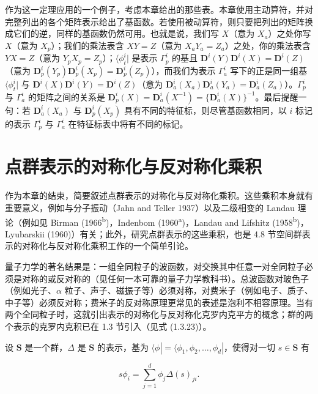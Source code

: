 作为这一定理应用的一个例子，考虑本章给出的那些表。本章使用主动算符，并对完整列出的各个矩阵表示给出了基函数。若使用被动算符，则只要把列出的矩阵换成它们的逆，同样的基函数仍然可用。也就是说，我们写 $X$（意为 $X_{a}$）之处你写 $X$（意为 $X_{p}$）；我们的乘法表含 $XY = Z$（意为 $X_{a}Y_{a} = Z_{a}$）之处，你的乘法表含 $YX = Z$（意为 $Y_{p}X_{p} = Z_{p}$）；$\langle \phi_{t}^{i}|$ 是表示 $\Gamma_{p}^{i}$ 的基且 $\mathbf{D}^{i}(Y)\mathbf{D}^{i}(X) = \mathbf{D}^{i}(Z)$（意为 $\mathbf{D}_{p}^{i}(Y_{p})\mathbf{D}_{p}^{i}(X_{p}) = \mathbf{D}_{p}^{i}(Z_{p})$），而我们为表示 $\Gamma_{a}^{i}$ 写下的正是同一组基 $\langle \phi_{t}^{i}|$ 与 $\mathbf{D}^{i}(X)\mathbf{D}^{i}(Y) = \mathbf{D}^{i}(Z)$（意为 $\mathbf{D}_{a}^{i}(X_{a})\mathbf{D}_{a}^{i}(Y_{a}) = \mathbf{D}_{a}^{i}(Z_{a})$）。$\Gamma_{p}^{i}$ 与 $\Gamma_{a}^{i}$ 的矩阵之间的关系是 $\mathbf{D}_{p}^{i}(X) = \mathbf{D}_{a}^{i}(X^{-1}) = \{\mathbf{D}_{a}^{i}(X)\}^{-1}$。最后提醒一句：若 $\mathbf{D}_{a}^{i}(X_{a})$ 与 $\mathbf{D}_{p}^{i}(X_{p})$ 具有不同的特征标，则尽管基函数相同，以 $i$ 标记的表示 $\Gamma_{p}^{i}$ 与 $\Gamma_{a}^{i}$ 在特征标表中将有不同的标记。

\section{点群表示的对称化与反对称化乘积}

作为本章的结束，简要叙述点群表示的对称化与反对称化乘积。这些乘积本身就有重要意义，例如与分子振动（Jahn and Teller 1937）以及二级相变的 Landau 理论（例如见 Birman (1966\textsuperscript{b})，Indenbom (1960\textsuperscript{a})，Landau and Lifshitz (1958\textsuperscript{b})，Lyubarskii (1960)）有关；此外，研究点群表示的这些乘积，也是 4.8 节空间群表示的对称化与反对称化乘积工作的一个简单引论。

量子力学的著名结果是：一组全同粒子的波函数，对交换其中任意一对全同粒子必须是对称的或反对称的（见任何一本可靠的量子力学教科书）。总波函数对玻色子（例如光子、$\alpha$ 粒子、声子、磁振子等）必须对称，对费米子（例如电子、质子、中子等）必须反对称；费米子的反对称原理更常见的表述是泡利不相容原理。当有两个全同粒子时，这就引出表示的对称化与反对称化克罗内克平方的概念；群的两个表示的克罗内克积已在 1.3 节引入（见式 (1.3.23)）。

设 $\mathbf{S}$ 是一个群，$\Delta$ 是 $\mathbf{S}$ 的表示，基为 $\langle \phi| = \langle \phi_{1}, \phi_{2}, \ldots, \phi_{d}|$，使得对一切 $s \in \mathbf{S}$ 有

\begin{equation*}
s\phi_{i} = \sum_{j=1}^{d} \phi_{j}\Delta(s)_{ji}.
\tag{2.6.1}
\end{equation*}

